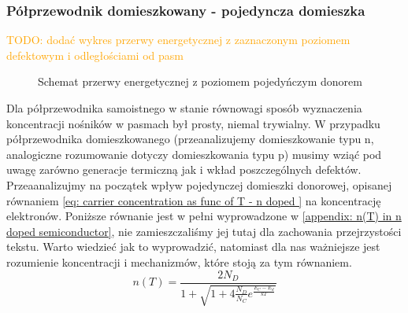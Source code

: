         \subsubsection{Półprzewodnik domieszkowany - pojedyncza domieszka} \label{seq: Ef(T,Nd)} \label{note: obsadzenie defektów od Ef}
        
            \noindent \textcolor{orange}{TODO: dodać wykres przerwy energetycznej z zaznaczonym poziomem defektowym i odległościami od pasm}
            \begin{figure}
                \centering
                \caption{Schemat przerwy energetycznej z poziomem pojedyńczym donorem}
                \label{fig: bandgap-defect}
            \end{figure}

            \noindent Dla półprzewodnika samoistnego w stanie równowagi sposób wyznaczenia koncentracji nośników w pasmach był prosty, niemal trywialny. W przypadku półprzewodnika domieszkowanego (przeanalizujemy domieszkowanie typu n, analogiczne rozumowanie dotyczy domieszkowania typu p) musimy wziąć pod uwagę zarówno generacje termiczną jak i wkład poszczególnych defektów. Przeaanalizujmy na początek wpływ pojedynczej domieszki donorowej, opisanej równaniem
            \ref{eq: carrier concentration as func of T - n doped } na koncentrację elektronów. Poniższe równanie jest w pełni wyprowadzone w \ref{appendix: n(T) in n doped semiconductor}, nie zamieszczaliśmy jej tutaj dla zachowania przejrzystości tekstu. Warto wiedzieć jak to wyprowadzić, natomiast dla nas ważniejsze jest rozumienie koncentracji i mechanizmów, które stoją za tym równaniem. 
            \begin{equation}
                n(T) = \frac{2N_D}{1 + \sqrt{1 + 4\frac{N_D}{N_C}e^{\frac{E_C - E_d}{kT}}}} \label{eq: carrier concentration as func of T - n doped }
            \end{equation}
            
